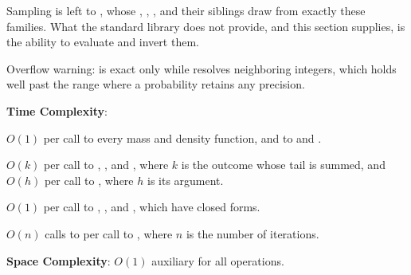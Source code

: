 Sampling is left to , whose , , , and their siblings draw from exactly these families. What the standard library does not provide, and this section supplies, is the ability to evaluate and invert them.

Overflow warning:  is exact only while  resolves neighboring integers, which holds well past the range where a  probability retains any precision.

\textbf{Time Complexity}:
\begin{compactitem}
  \item $O(1)$ per call to every mass and density function, and to  and .
  \item $O(k)$ per call to , , and , where $k$ is the outcome whose tail is summed, and $O(h)$ per call to , where $h$ is its  argument.
  \item $O(1)$ per call to , , and , which have closed forms.
  \item $O(n)$ calls to  per call to , where $n$ is the number of iterations.
\end{compactitem}

\textbf{Space Complexity}: $O(1)$ auxiliary for all operations.

